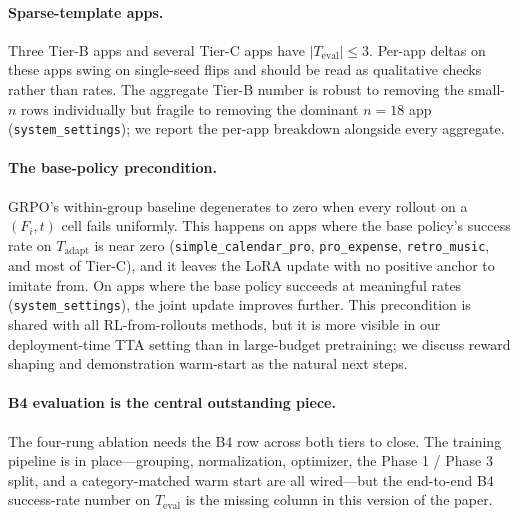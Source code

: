 \paragraph{Sparse-template apps.} Three Tier-B apps and several Tier-C apps have $|T_{\text{eval}}|\le 3$. Per-app deltas on these apps swing on single-seed flips and should be read as qualitative checks rather than rates. The aggregate Tier-B number is robust to removing the small-$n$ rows individually but fragile to removing the dominant $n{=}18$ app (\texttt{system\_settings}); we report the per-app breakdown alongside every aggregate.

\paragraph{The base-policy precondition.} GRPO's within-group baseline degenerates to zero when every rollout on a $(F_i, t)$ cell fails uniformly. This happens on apps where the base policy's success rate on $T_{\text{adapt}}$ is near zero (\texttt{simple\_calendar\_pro}, \texttt{pro\_expense}, \texttt{retro\_music}, and most of Tier-C), and it leaves the LoRA update with no positive anchor to imitate from. On apps where the base policy succeeds at meaningful rates (\texttt{system\_settings}), the joint update improves further. This precondition is shared with all RL-from-rollouts methods, but it is more visible in our deployment-time TTA setting than in large-budget pretraining; we discuss reward shaping and demonstration warm-start as the natural next steps.

\paragraph{B4 evaluation is the central outstanding piece.} The four-rung ablation needs the B4 row across both tiers to close. The training pipeline is in place---grouping, normalization, optimizer, the Phase 1 / Phase 3 split, and a category-matched warm start are all wired---but the end-to-end B4 success-rate number on $T_{\text{eval}}$ is the missing column in this version of the paper.
